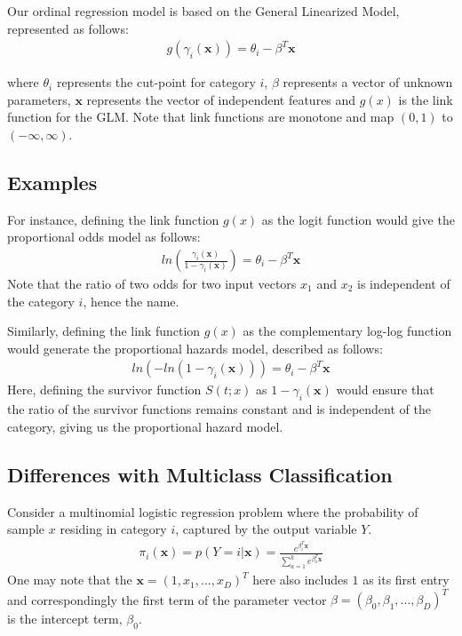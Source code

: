 \documentclass[a4paper, 11pt]{article}
\begin{document}
Our ordinal regression model is based on the General Linearized Model, represented as follows:
\begin{align}
    g(\gamma_i(\textbf{x})) = \theta_i - \beta^T\textbf{x} 
\end{align}

where $\theta_i$ represents the cut-point for category $i$, $\beta$ represents a vector of unknown parameters, $\textbf{x}$ represents the vector of independent features and $g(x)$ is the link function for the GLM.
Note that link functions are monotone and map $(0, 1)$ to $(-\infty, \infty)$. \newline

\subsection{Examples}
For instance, defining the link function $g(x)$ as the logit function would give the proportional odds model as follows:
\begin{align}
    ln\left(\frac{\gamma_i(\textbf{x})}{1 - \gamma_i(\textbf{x})}\right) = \theta_i - \beta^T\textbf{x}
\end{align}
Note that the ratio of two odds for two input vectors \textbf{$x_1$} and \textbf{$x_2$} is independent of the category $i$, hence the name.

Similarly, defining the link function $g(x)$ as the complementary log-log function would generate the proportional hazards model, described as follows:
\begin{align}
    ln(-ln(1 - \gamma_i(\textbf{x}))) = \theta_i - \beta^T\textbf{x}
\end{align}
Here, defining the survivor function $S(t;x)$ as $1 - \gamma_i(\textbf{x})$ would ensure that the ratio of the survivor functions remains constant and is independent of the category, giving us the proportional hazard model.

\subsection{Differences with Multiclass Classification} 
Consider a multinomial logistic regression problem where the probability of sample \textbf{$x$} residing in category $i$, captured by the output variable $Y$.
\begin{align}
    \pi_i(\textbf{x}) = p(Y = i|\textbf{x}) = \frac{e^{\beta_i^T\textbf{x}}}{\sum_{a=1}^{k} e^{\beta_a^T\textbf{x}}}
\end{align}
One may note that the $\textbf{x}= (1, x_1, ..., x_D)^T$ here also includes $1$ as its first entry and correspondingly the first term of the parameter vector $\beta = (\beta_0, \beta_1, ..., \beta_D)^T$ is the intercept term, $\beta_0$. \newline
\end{document}
